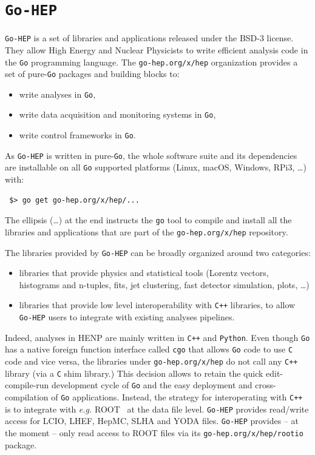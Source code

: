 \documentclass[a4paper]{jpconf}
\begin{document}
\section{\texttt{Go-HEP}}

\texttt{Go-HEP} is a set of libraries and applications released under the BSD-3 license.
They allow High Energy and Nuclear Physicists to write efficient analysis code in the \texttt{Go} programming language.
The \texttt{go-hep.org/x/hep} organization provides a set of pure-\texttt{Go} packages and building blocks to:
\begin{itemize}
	\item write analyses in \texttt{Go},
	\item write data acquisition and monitoring systems in \texttt{Go},
	\item write control frameworks in \texttt{Go}.
\end{itemize}

As \texttt{Go-HEP} is written in pure-\texttt{Go}, the whole software suite and its dependencies are installable on all \texttt{Go} supported platforms (Linux, macOS, Windows, RPi3, \ldots) with:
\begin{verbatim}
 $> go get go-hep.org/x/hep/...
\end{verbatim}
The ellipsis (\ldots) at the end instructs the \texttt{go} tool to compile and install all the libraries and applications that are part of the \texttt{go-hep.org/x/hep} repository.

The libraries provided by \texttt{Go-HEP} can be broadly organized around two categories:
\begin{itemize}
	\item libraries that provide physics and statistical tools (Lorentz vectors, histograms and n-tuples, fits, jet clustering, fast detector simulation, plots, \ldots)
	\item libraries that provide low level interoperability with \texttt{C++} libraries, to allow \texttt{Go-HEP} users to integrate with existing analyses pipelines.
\end{itemize}

Indeed, analyses in HENP are mainly written in \texttt{C++} and \texttt{Python}.
Even though \texttt{Go} has a native foreign function interface called \texttt{cgo} that allows \texttt{Go} code to use \texttt{C} code and vice versa, the libraries under \texttt{go-hep.org/x/hep} do not call any \texttt{C++} library (via a \texttt{C} shim library.)
This decision allows to retain the quick edit-compile-run development cycle of \texttt{Go} and the easy deployment and cross-compilation of \texttt{Go} applications.
Instead, the strategy for interoperating with \texttt{C++} is to integrate with \emph{e.g.} ROOT~\cite{ref-ROOT} at the data file level.
\texttt{Go-HEP} provides read/write access for LCIO, LHEF, HepMC, SLHA and YODA files.
\texttt{Go-HEP} provides -- at the moment -- only read access to ROOT files via its \texttt{go-hep.org/x/hep/rootio} package.
\end{document}
